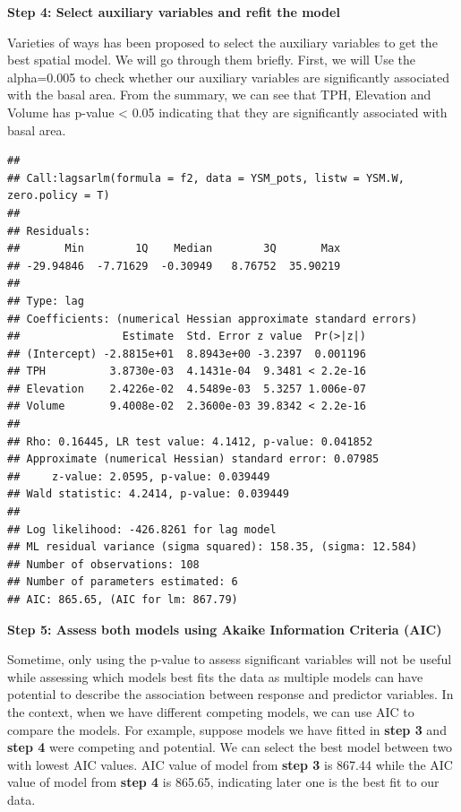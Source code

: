 \documentclass[
]{book}
\begin{document}
\textbf{Step 4: Select auxiliary variables and refit the model}

Varieties of ways has been proposed to select the auxiliary variables to get the best spatial model. We will go through them briefly. First, we will Use the alpha=0.005 to check whether our auxiliary variables are significantly associated with the basal area. From the summary, we can see that TPH, Elevation and Volume has p-value \textless{} 0.05 indicating that they are significantly associated with basal area.

\begin{verbatim}
## 
## Call:lagsarlm(formula = f2, data = YSM_pots, listw = YSM.W, zero.policy = T)
## 
## Residuals:
##       Min        1Q    Median        3Q       Max 
## -29.94846  -7.71629  -0.30949   8.76752  35.90219 
## 
## Type: lag 
## Coefficients: (numerical Hessian approximate standard errors) 
##                Estimate  Std. Error z value  Pr(>|z|)
## (Intercept) -2.8815e+01  8.8943e+00 -3.2397  0.001196
## TPH          3.8730e-03  4.1431e-04  9.3481 < 2.2e-16
## Elevation    2.4226e-02  4.5489e-03  5.3257 1.006e-07
## Volume       9.4008e-02  2.3600e-03 39.8342 < 2.2e-16
## 
## Rho: 0.16445, LR test value: 4.1412, p-value: 0.041852
## Approximate (numerical Hessian) standard error: 0.07985
##     z-value: 2.0595, p-value: 0.039449
## Wald statistic: 4.2414, p-value: 0.039449
## 
## Log likelihood: -426.8261 for lag model
## ML residual variance (sigma squared): 158.35, (sigma: 12.584)
## Number of observations: 108 
## Number of parameters estimated: 6 
## AIC: 865.65, (AIC for lm: 867.79)
\end{verbatim}

\textbf{Step 5: Assess both models using Akaike Information Criteria (AIC)}

Sometime, only using the p-value to assess significant variables will not be useful while assessing which models best fits the data as multiple models can have potential to describe the association between response and predictor variables. In the context, when we have different competing models, we can use AIC \citep[for details see,][]{akaike_information_1973} to compare the models. For example, suppose models we have fitted in \textbf{step 3} and \textbf{step 4} were competing and potential. We can select the best model between two with lowest AIC values. AIC value of model from \textbf{step 3} is 867.44 while the AIC value of model from \textbf{step 4} is 865.65, indicating later one is the best fit to our data.
\end{document}
